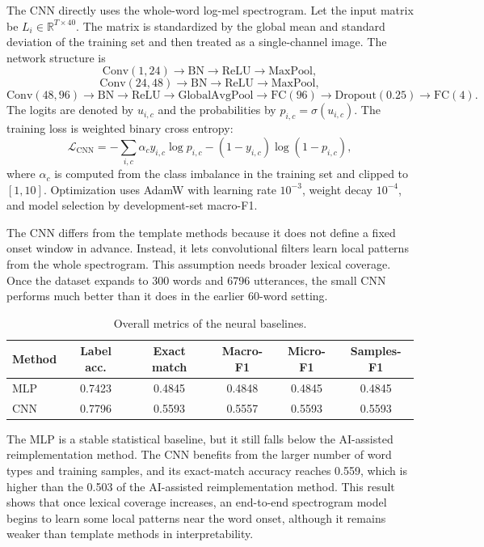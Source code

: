 The CNN directly uses the whole-word log-mel spectrogram. Let the input matrix be $L_i\in\mathbb{R}^{T\times40}$. The matrix is standardized by the global mean and standard deviation of the training set and then treated as a single-channel image. The network structure is
\[
\mathrm{Conv}(1,24)\rightarrow \mathrm{BN}\rightarrow \mathrm{ReLU}\rightarrow \mathrm{MaxPool},
\]
\[
\mathrm{Conv}(24,48)\rightarrow \mathrm{BN}\rightarrow \mathrm{ReLU}\rightarrow \mathrm{MaxPool},
\]
\[
\mathrm{Conv}(48,96)\rightarrow \mathrm{BN}\rightarrow \mathrm{ReLU}\rightarrow
\mathrm{GlobalAvgPool}\rightarrow \mathrm{FC}(96)\rightarrow \mathrm{Dropout}(0.25)\rightarrow \mathrm{FC}(4).
\]
The logits are denoted by $u_{i,c}$ and the probabilities by $p_{i,c}=\sigma(u_{i,c})$. The training loss is weighted binary cross entropy:
\[
\mathcal{L}_{\mathrm{CNN}}
=-\sum_{i,c}\alpha_c y_{i,c}\log p_{i,c}
-(1-y_{i,c})\log(1-p_{i,c}),
\]
where $\alpha_c$ is computed from the class imbalance in the training set and clipped to $[1,10]$. Optimization uses AdamW with learning rate $10^{-3}$, weight decay $10^{-4}$, and model selection by development-set macro-F1.

The CNN differs from the template methods because it does not define a fixed onset window in advance. Instead, it lets convolutional filters learn local patterns from the whole spectrogram. This assumption needs broader lexical coverage. Once the dataset expands to 300 words and 6796 utterances, the small CNN performs much better than it does in the earlier 60-word setting.

\begin{table}[H]
    \centering
    \caption{Overall metrics of the neural baselines.}
    \label{tab:ai-summary}
    \begin{tabular}{lccccc}
        \toprule
        Method & Label acc. & Exact match & Macro-F1 & Micro-F1 & Samples-F1 \\
        \midrule
        MLP & 0.7423 & 0.4845 & 0.4848 & 0.4845 & 0.4845 \\
        CNN & 0.7796 & 0.5593 & 0.5557 & 0.5593 & 0.5593 \\
        \bottomrule
    \end{tabular}
\end{table}

The MLP is a stable statistical baseline, but it still falls below the AI-assisted reimplementation method. The CNN benefits from the larger number of word types and training samples, and its exact-match accuracy reaches 0.559, which is higher than the 0.503 of the AI-assisted reimplementation method. This result shows that once lexical coverage increases, an end-to-end spectrogram model begins to learn some local patterns near the word onset, although it remains weaker than template methods in interpretability.

